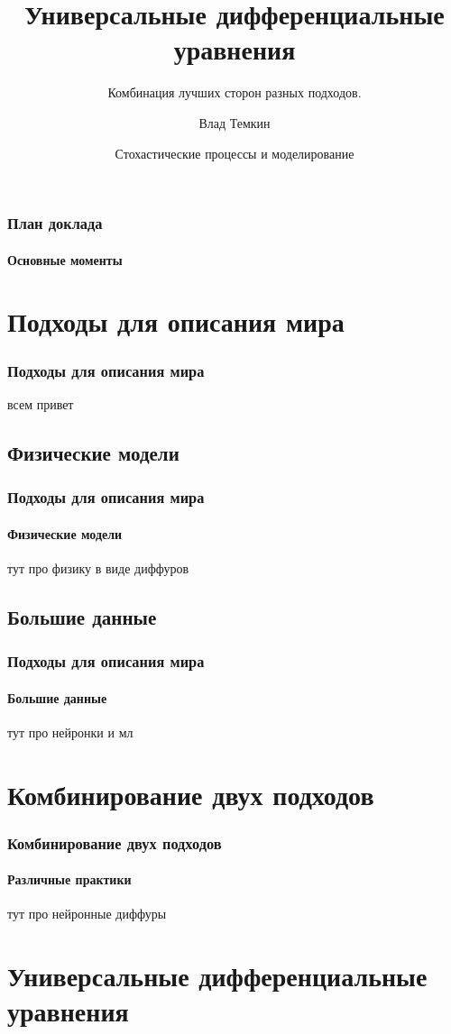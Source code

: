 \documentclass[10pt,pdf,hyperref={unicode}]{beamer}
\title[UDE]{Универсальные дифференциальные уравнения}
\subtitle{Комбинация лучших сторон разных подходов.}
\author{Влад Темкин}
\institute[HSE] %
{
	Высшая Школа Экономики\\
	Факультет Физики
}
\date[\today]
{Стохастические процессы и моделирование}
\begin{document}
	
	\begin{frame}
		\titlepage
	\end{frame} 
	
	
	\begin{frame}
		\frametitle{План доклада} 
		\framesubtitle{Основные моменты}
		\tableofcontents[pausesections]
	\end{frame}


	\section{Подходы для описания мира}
	
		\begin{frame}
			\frametitle{Подходы для описания мира} 
				всем привет
		\end{frame}
	
	
		\subsection{Физические модели}
		
			\begin{frame}
				\frametitle{Подходы для описания мира} 
				\framesubtitle{Физические модели}
					тут про физику в виде диффуров
			\end{frame}
		
		
		\subsection{Большие данные}
		
			\begin{frame}
				\frametitle{Подходы для описания мира} 
				\framesubtitle{Большие данные}
					тут про нейронки и мл
			\end{frame}
			
			
	\section{Комбинирование двух подходов}
		
		\begin{frame}
			\frametitle{Комбинирование двух подходов} 
			\framesubtitle{Различные практики}
				тут про нейронные диффуры 
		\end{frame}
		
		
	\section{Универсальные дифференциальные уравнения}
	
\end{document}
